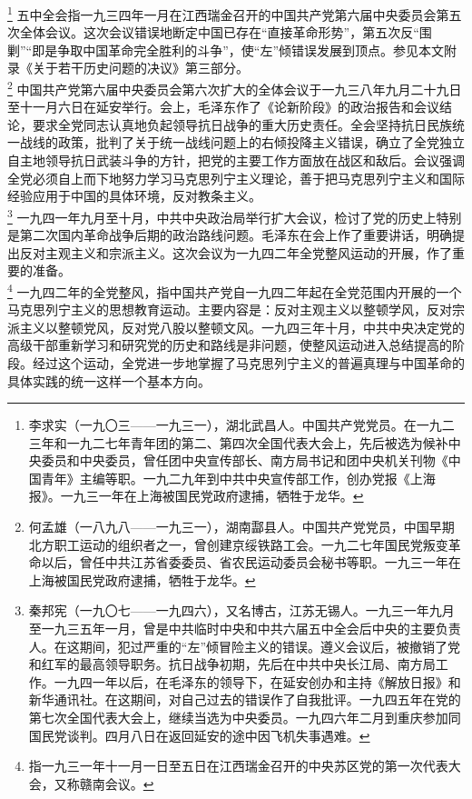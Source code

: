 \documentclass[cn,11pt,chinese]{elegantbook}
\begin{document}
\footnote[8]{ 李求实（一九〇三——一九三一），湖北武昌人。中国共产党党员。在一九二三年和一九二七年青年团的第二、第四次全国代表大会上，先后被选为候补中央委员和中央委员，曾任团中央宣传部长、南方局书记和团中央机关刊物《中国青年》主编等职。一九二九年到中共中央宣传部工作，创办党报《上海报》。一九三一年在上海被国民党政府逮捕，牺牲于龙华。} 五中全会指一九三四年一月在江西瑞金召开的中国共产党第六届中央委员会第五次全体会议。这次会议错误地断定中国已存在“直接革命形势”，第五次反“围剿”“即是争取中国革命完全胜利的斗争”，使“左”倾错误发展到顶点。参见本文附录《关于若干历史问题的决议》第三部分。\\
\footnote[9]{ 何孟雄（一八九八——一九三一），湖南酃县人。中国共产党党员，中国早期北方职工运动的组织者之一，曾创建京绥铁路工会。一九二七年国民党叛变革命以后，曾任中共江苏省委委员、省农民运动委员会秘书等职。一九三一年在上海被国民党政府逮捕，牺牲于龙华。} 中国共产党第六届中央委员会第六次扩大的全体会议于一九三八年九月二十九日至十一月六日在延安举行。会上，毛泽东作了《论新阶段》的政治报告和会议结论，要求全党同志认真地负起领导抗日战争的重大历史责任。全会坚持抗日民族统一战线的政策，批判了关于统一战线问题上的右倾投降主义错误，确立了全党独立自主地领导抗日武装斗争的方针，把党的主要工作方面放在战区和敌后。会议强调全党必须自上而下地努力学习马克思列宁主义理论，善于把马克思列宁主义和国际经验应用于中国的具体环境，反对教条主义。\\
\footnote[10]{ 秦邦宪（一九〇七——一九四六），又名博古，江苏无锡人。一九三一年九月至一九三五年一月，曾是中共临时中央和中共六届五中全会后中央的主要负责人。在这期间，犯过严重的“左”倾冒险主义的错误。遵义会议后，被撤销了党和红军的最高领导职务。抗日战争初期，先后在中共中央长江局、南方局工作。一九四一年以后，在毛泽东的领导下，在延安创办和主持《解放日报》和新华通讯社。在这期间，对自己过去的错误作了自我批评。一九四五年在党的第七次全国代表大会上，继续当选为中央委员。一九四六年二月到重庆参加同国民党谈判。四月八日在返回延安的途中因飞机失事遇难。} 一九四一年九月至十月，中共中央政治局举行扩大会议，检讨了党的历史上特别是第二次国内革命战争后期的政治路线问题。毛泽东在会上作了重要讲话，明确提出反对主观主义和宗派主义。这次会议为一九四二年全党整风运动的开展，作了重要的准备。\\
\footnote[11]{ 指一九三一年十一月一日至五日在江西瑞金召开的中央苏区党的第一次代表大会，又称赣南会议。} 一九四二年的全党整风，指中国共产党自一九四二年起在全党范围内开展的一个马克思列宁主义的思想教育运动。主要内容是：反对主观主义以整顿学风，反对宗派主义以整顿党风，反对党八股以整顿文风。一九四三年十月，中共中央决定党的高级干部重新学习和研究党的历史和路线是非问题，使整风运动进入总结提高的阶段。经过这个运动，全党进一步地掌握了马克思列宁主义的普遍真理与中国革命的具体实践的统一这样一个基本方向。\\
\end{document}
